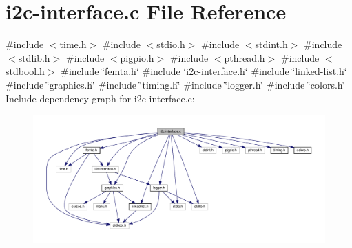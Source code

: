 \hypertarget{i2c-interface_8c}{}\section{i2c-\/interface.c File Reference}
\label{i2c-interface_8c}
{\ttfamily \#include $<$time.\+h$>$}\newline
{\ttfamily \#include $<$stdio.\+h$>$}\newline
{\ttfamily \#include $<$stdint.\+h$>$}\newline
{\ttfamily \#include $<$stdlib.\+h$>$}\newline
{\ttfamily \#include $<$pigpio.\+h$>$}\newline
{\ttfamily \#include $<$pthread.\+h$>$}\newline
{\ttfamily \#include $<$stdbool.\+h$>$}\newline
{\ttfamily \#include \char`\"{}femta.\+h\char`\"{}}\newline
{\ttfamily \#include \char`\"{}i2c-\/interface.\+h\char`\"{}}\newline
{\ttfamily \#include \char`\"{}linked-\/list.\+h\char`\"{}}\newline
{\ttfamily \#include \char`\"{}graphics.\+h\char`\"{}}\newline
{\ttfamily \#include \char`\"{}timing.\+h\char`\"{}}\newline
{\ttfamily \#include \char`\"{}logger.\+h\char`\"{}}\newline
{\ttfamily \#include \char`\"{}colors.\+h\char`\"{}}\newline
Include dependency graph for i2c-\/interface.c\+:\nopagebreak
\begin{figure}[H]
\begin{center}
\leavevmode
\includegraphics[width=350pt]{i2c-interface_8c__incl}
\end{center}
\end{figure}
